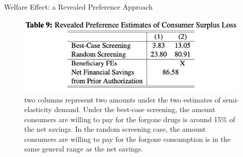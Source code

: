 \begin{frame}{Welfare Effect: a Revealed Preference Approach}
    \begin{figure}
        \centering
        \includegraphics[width=0.75\linewidth]{tb9.png}
        \caption{two columns represent two amounts under the two estimates of semi-elasticity demand. Under the best-case screening, the amount consumers are willing to pay for the forgone drugs is around 15\% of the net savings. In the random screening case, the amount consumers are willing to pay for the forgone consumption is in the same general range as the net savings.}
        \label{fig:enter-label}
    \end{figure}
\end{frame}